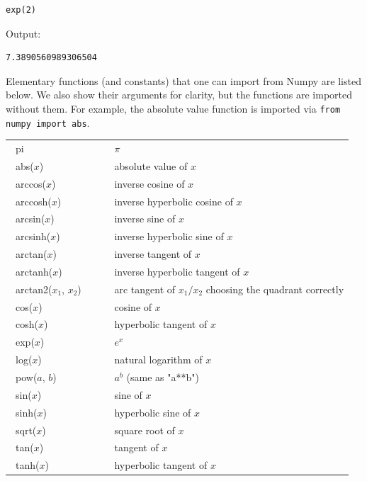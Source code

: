 \documentclass[article,A4,12pt]{llncs}
\begin{document}
\begin{bbox}
\begin{verbatim}
exp(2)
\end{verbatim}
\end{bbox}
\vspace{6mm}

\noindent
Output:\\

\begin{ybox}
\begin{verbatim}
7.3890560989306504
\end{verbatim}
\end{ybox}
\vspace{6mm}

\noindent
Elementary functions (and constants) that one can import from Numpy are listed
below. We also show their arguments for clarity, but the functions are imported without 
them. For example, the absolute value function is imported via {\tt from numpy import abs}.\\

\begin{center}
\begin{tabular}{|l|l|}
\hline
\ pi &  \ $\pi$\\
\ abs($x$) &\   absolute value of $x$\\
\ arccos($x$) &\   inverse cosine of $x$ \\
\ arccosh($x$) &\   inverse hyperbolic cosine of $x$ \\
\ arcsin($x$) &\  inverse sine of $x$ \\
\ arcsinh($x$) &\  inverse hyperbolic sine of $x$ \\
\ arctan($x$) &\  inverse tangent of $x$ \\
\ arctanh($x$) &\  inverse hyperbolic tangent of $x$ \\
\ arctan2($x_1$, $x_2$) \ \ \ &\  arc tangent of $x_1/x_2$ choosing the quadrant correctly \\
\ cos($x$) &\  cosine of $x$ \\
\ cosh($x$) &\  hyperbolic tangent of $x$ \\
\ exp($x$) &\  $e^x$ \\
\ log($x$) &\  natural logarithm of $x$ \\
\ pow($a$, $b$) &\  $a^b$ (same as "a**b")\\
\ sin($x$) &\  sine of $x$ \\
\ sinh($x$) &\  hyperbolic sine of $x$ \\
\ sqrt($x$) &\  square root of $x$ \\
\ tan($x$) &\  tangent of $x$\\
\ tanh($x$) &\  hyperbolic tangent of $x$ \\
\hline
\end{tabular}
\end{center}
\vspace{4mm}
\noindent
\end{document}

